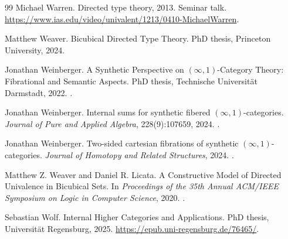 \documentclass[12pt]{article}
\begin{document}
\begin{thebibliography}{99}
Michael Warren.
\newblock Directed type theory, 2013.
\newblock Seminar talk. \url{https://www.ias.edu/video/univalent/1213/0410-MichaelWarren}.

Matthew Weaver.
\newblock Bicubical Directed Type Theory.
\newblock PhD thesis, Princeton University, 2024.

Jonathan Weinberger.
\newblock A Synthetic Perspective on $(\infty,1)$-Category Theory: Fibrational and Semantic Aspects.
\newblock PhD thesis, Technische Universität Darmstadt, 2022.
\newblock {}.

Jonathan Weinberger.
\newblock Internal sums for synthetic fibered $(\infty,1)$-categories.
\newblock \emph{Journal of Pure and Applied Algebra}, 228(9):107659, 2024.
\newblock {}.

Jonathan Weinberger.
\newblock Two-sided cartesian fibrations of synthetic $(\infty,1)$-categories.
\newblock \emph{Journal of Homotopy and Related Structures}, 2024.
\newblock {}.

Matthew Z. Weaver and Daniel R. Licata.
\newblock A Constructive Model of Directed Univalence in Bicubical Sets.
\newblock In \emph{Proceedings of the 35th Annual ACM/IEEE Symposium on Logic in Computer Science}, 2020.
\newblock {}.

Sebastian Wolf.
\newblock Internal Higher Categories and Applications.
\newblock PhD thesis, Universität Regensburg, 2025.
\newblock \url{https://epub.uni-regensburg.de/76465/}.

\end{thebibliography}
\end{document}
